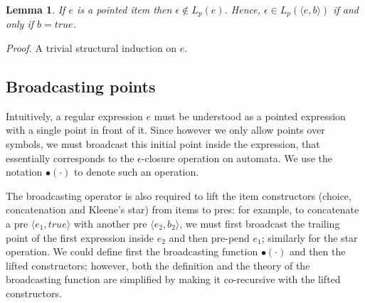 \documentclass[preprint]{sigplanconf}
\newcommand{\true}{\mathit{true}}
\newcommand{\Lp}[1]{L_p(#1)}
\newcounter{item}
\newtheorem{lemma}[item]{Lemma}
\newenvironment{proof}{\begin{trivlist}\item[]{\em Proof.}}{\end{trivlist}}
\begin{document}
\begin{lemma}
\label{lemma:epsilon}
If $e$ is a pointed item then $\epsilon \not\in \Lp e$. 
Hence, $\epsilon \in \Lp{\langle e, b \rangle}$ if and only if 
$b = \true$.
\end{lemma}
\begin{proof}
A trivial structural induction on $e$.
\end{proof}

\subsection{Broadcasting points}
Intuitively, a regular expression $e$ must be understood as a pointed
expression with a single point in front of it. Since however we only
allow points over symbols, we must broadcast this initial point
inside the expression, 
that essentially corresponds to the $\epsilon$-closure operation on
automata. We use the notation $\bullet(\cdot)$ to denote such an operation.

The broadcasting operator is also required to lift the item constructors 
(choice, concatenation and Kleene's star) from items to pres: for example,
to concatenate a pre $\langle e_1, \true \rangle$ 
with another pre $\langle e_2, b_2 \rangle$, we must first
broadcast the trailing point of the first expression inside $e_2$ and then
pre-pend $e_1$; similarly for the star operation.
We could define first the broadcasting
function $\bullet(\cdot)$ and then the lifted constructors; however, 
both the definition and the theory of the 
broadcasting function are simplified by making it
co-recursive with the lifted constructors.
\end{document}
